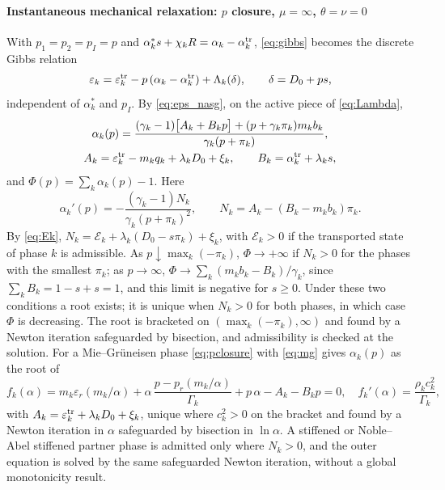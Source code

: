\paragraph{Instantaneous mechanical relaxation: $p$ closure, $\mu=\infty$, $\theta=\nu=0$}
With $p_1=p_2=p_I=p$ and $\alpha^*_ks+\chi_kR=\alpha_k-\alpha^{\rm tr}_k$, \eqref{eq:gibbs} becomes the discrete Gibbs relation
\begin{equation}
\varepsilon_k=\varepsilon^{\rm tr}_k-p\,(\alpha_k-\alpha^{\rm tr}_k)+\Lambda_k(\delta),\qquad \delta=D_0+ps ,
\label{eq:pclosure}
\end{equation}
independent of $\alpha^*_k$ and $p_I$. By \eqref{eq:eps_nasg}, on the active piece of \eqref{eq:Lambda},
\begin{equation}
\begin{gathered}
\alpha_k(p)=\frac{(\gamma_k-1)\big[A_k+B_kp\big]+(p+\gamma_k\pi_k)m_kb_k}{\gamma_k(p+\pi_k)},\\
A_k=\varepsilon^{\rm tr}_k-m_kq_k+\lambda_kD_0+\xi_k,\qquad B_k=\alpha^{\rm tr}_k+\lambda_ks ,
\end{gathered}
\label{eq:alpha_p}
\end{equation}
and $\Phi(p)=\sum_k\alpha_k(p)-1$. Here
\[
\alpha_k'(p)=-\frac{(\gamma_k-1)N_k}{\gamma_k(p+\pi_k)^2},\qquad N_k=A_k-(B_k-m_kb_k)\pi_k .
\]
By \eqref{eq:Ek}, $N_k=\mathcal E_k+\lambda_k(D_0-s\pi_k)+\xi_k$, with $\mathcal E_k>0$ if the transported state of phase $k$ is admissible.
As $p\downarrow\max_k(-\pi_k)$, $\Phi\to+\infty$ if $N_k>0$ for the phases with the smallest $\pi_k$; as $p\to\infty$,
$\Phi\to\sum_k(m_kb_k-B_k)/\gamma_k$, since $\sum_kB_k=1-s+s=1$, and this limit is negative for $s\ge0$. Under these two
conditions a root exists; it is unique when $N_k>0$ for both phases, in which case $\Phi$ is decreasing. The root is
bracketed on $(\max_k(-\pi_k),\infty)$ and found by a Newton iteration safeguarded by bisection, and admissibility is checked at the
solution. For a Mie--Gr\"uneisen phase \eqref{eq:pclosure} with \eqref{eq:mg} gives $\alpha_k(p)$ as the root of
\[
f_k(\alpha)=m_k\varepsilon_r(m_k/\alpha)+\alpha\,\frac{p-p_r(m_k/\alpha)}{\Gamma_k}+p\,\alpha-A_k-B_kp=0,\quad
f_k'(\alpha)=\frac{\rho_kc_k^2}{\Gamma_k} ,
\]
with $A_k=\varepsilon^{\rm tr}_k+\lambda_kD_0+\xi_k$, unique where $c_k^2>0$ on the bracket and found by a Newton iteration in $\alpha$ safeguarded by
bisection in $\ln\alpha$. A stiffened or Noble--Abel stiffened partner phase is admitted only where $N_k>0$, and the outer
equation is solved by the same safeguarded Newton iteration, without a global monotonicity result.

